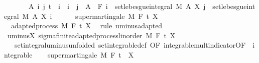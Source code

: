 \begin{isabellebody}
\ \ \ \ \ \ \ {\isachardoublequoteopen}{\isasymAnd}A\ i\ j{\isachardot}{\kern0pt}\ t\ {\isasymle}\ i\ {\isasymLongrightarrow}\ i\ {\isasymle}\ j\ {\isasymLongrightarrow}\ A\ {\isasymin}\ F\ i\ {\isasymLongrightarrow}\ set{\isacharunderscore}{\kern0pt}lebesgue{\isacharunderscore}{\kern0pt}integral\ M\ A\ {\isacharparenleft}{\kern0pt}X\ j{\isacharparenright}{\kern0pt}\ {\isasymle}\ set{\isacharunderscore}{\kern0pt}lebesgue{\isacharunderscore}{\kern0pt}integral\ M\ A\ {\isacharparenleft}{\kern0pt}X\ i{\isacharparenright}{\kern0pt}{\isachardoublequoteclose}\ \isanewline
\ \ \ \ \ {\isachardoublequoteopen}supermartingale\ M\ F\ t\ X{\isachardoublequoteclose}\isanewline
%
\isadelimproof
%
\endisadelimproof
%
\isatagproof
{}\isamarkupfalse%
\ {\isacharminus}{\kern0pt}\isanewline
\ \ \isamarkupfalse%
\ {\isacharunderscore}{\kern0pt}{\isacharcolon}{\kern0pt}\ adapted{\isacharunderscore}{\kern0pt}process\ M\ F\ t\ {\isachardoublequoteopen}{\isacharminus}{\kern0pt}X{\isachardoublequoteclose}\ \isamarkupfalse%
\ {\isacharparenleft}{\kern0pt}rule\ uminus{\isacharunderscore}{\kern0pt}adapted{\isacharparenright}{\kern0pt}\isanewline
\ \ \isamarkupfalse%
\ uminus{\isacharunderscore}{\kern0pt}X{\isacharcolon}{\kern0pt}\ sigma{\isacharunderscore}{\kern0pt}finite{\isacharunderscore}{\kern0pt}adapted{\isacharunderscore}{\kern0pt}process{\isacharunderscore}{\kern0pt}linorder\ M\ F\ t\ {\isachardoublequoteopen}{\isacharminus}{\kern0pt}X{\isachardoublequoteclose}\ \isacommand{{\isachardot}{\kern0pt}{\isachardot}{\kern0pt}}\isamarkupfalse%
\isanewline
\ \ \isamarkupfalse%
\ {\isacharasterisk}{\kern0pt}\ {\isacharequal}{\kern0pt}\ set{\isacharunderscore}{\kern0pt}integral{\isacharunderscore}{\kern0pt}uminus{\isacharbrackleft}{\kern0pt}unfolded\ set{\isacharunderscore}{\kern0pt}integrable{\isacharunderscore}{\kern0pt}def{\isacharcomma}{\kern0pt}\ OF\ integrable{\isacharunderscore}{\kern0pt}mult{\isacharunderscore}{\kern0pt}indicator{\isacharbrackleft}{\kern0pt}OF\ {\isacharunderscore}{\kern0pt}\ integrable{\isacharbrackright}{\kern0pt}{\isacharbrackright}{\kern0pt}\isanewline
\ \ \isamarkupfalse%
\ {\isachardoublequoteopen}supermartingale\ M\ F\ t\ {\isacharparenleft}{\kern0pt}{\isacharminus}{\kern0pt}{\isacharparenleft}{\kern0pt}{\isacharminus}{\kern0pt}\ X{\isacharparenright}{\kern0pt}{\isacharparenright}{\kern0pt}{\isachardoublequoteclose}\isanewline

\end{isabellebody}

